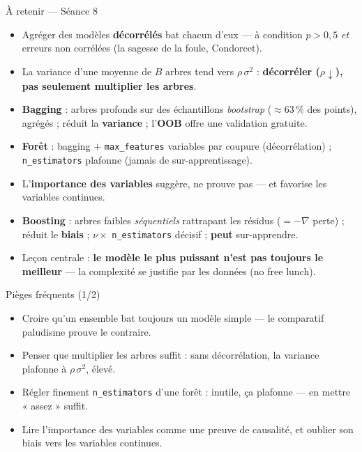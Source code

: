\documentclass[aspectratio=169,11pt]{beamer}
\begin{document}
\begin{frame}{À retenir — Séance 8}
\begin{ucadret}[L'essentiel]
\begin{itemize}\small
  \item Agréger des modèles \textbf{décorrélés} bat chacun d'eux — à condition $p > 0{,}5$ \emph{et} erreurs non corrélées (la sagesse de la foule, Condorcet).
  \item La variance d'une moyenne de $B$ arbres tend vers $\rho\,\sigma^2$ : \textbf{décorréler ($\rho \downarrow$), pas seulement multiplier les arbres}.
  \item \textbf{Bagging} : arbres profonds sur des échantillons \emph{bootstrap} ($\approx 63\,\%$ des points), agrégés ; réduit la \textbf{variance} ; l'\textbf{OOB} offre une validation gratuite.
  \item \textbf{Forêt} : bagging $+$ \texttt{max\_features} variables par coupure (décorrélation) ; \texttt{n\_estimators} plafonne (jamais de sur-apprentissage).
  \item L'\textbf{importance des variables} suggère, ne prouve pas — et favorise les variables continues.
  \item \textbf{Boosting} : arbres faibles \emph{séquentiels} rattrapant les résidus ($= -\nabla$ perte) ; réduit le \textbf{biais} ; $\nu \times$ \texttt{n\_estimators} décisif ; \textbf{peut} sur-apprendre.
  \item Leçon centrale : \textbf{le modèle le plus puissant n'est pas toujours le meilleur} — la complexité se justifie par les données (no free lunch).
\end{itemize}
\end{ucadret}
\end{frame}

\begin{frame}{Pièges fréquents (1/2)}
\begin{itemize}\small
  \item Croire qu'un ensemble bat toujours un modèle simple — le comparatif paludisme prouve le contraire.
  \item Penser que multiplier les arbres suffit : sans décorrélation, la variance plafonne à $\rho\,\sigma^2$, élevé.
  \item Régler finement \texttt{n\_estimators} d'une forêt : inutile, ça plafonne — en mettre « assez » suffit.
  \item Lire l'importance des variables comme une preuve de causalité, et oublier son biais vers les variables continues.
\end{itemize}
\end{frame}
\end{document}
